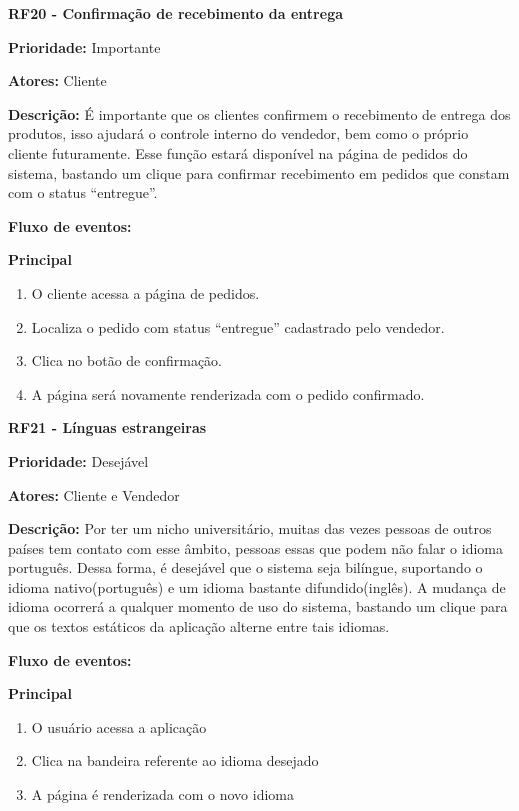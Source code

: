 \begin{apendicesenv}
\textbf{RF20 - Confirmação de recebimento da entrega} \par
\textbf{Prioridade:} Importante \par
\textbf{Atores:} Cliente \par
\textbf{Descrição:} É importante que os clientes confirmem o recebimento de entrega dos produtos, isso ajudará o controle interno do vendedor, bem como o próprio cliente futuramente. Esse função estará disponível na página de pedidos do sistema, bastando um clique para confirmar recebimento em pedidos que constam com o status “entregue”. \par
\textbf{Fluxo de eventos:} \par
\textbf{Principal} \par
\begin{enumerate}
  \item O cliente acessa a página de pedidos.
  \item Localiza o pedido com status “entregue” cadastrado pelo vendedor.
  \item Clica no botão de confirmação.
  \item A página será novamente renderizada com o pedido confirmado.
\end{enumerate}

\textbf{RF21 - Línguas estrangeiras} \par
\textbf{Prioridade:} Desejável \par
\textbf{Atores:} Cliente e Vendedor \par
\textbf{Descrição:} Por ter um nicho universitário, muitas das vezes pessoas de outros países tem contato com esse âmbito, pessoas essas que podem não falar o idioma português. Dessa forma, é desejável que o sistema seja bilíngue, suportando o idioma nativo(português) e um idioma bastante difundido(inglês). A mudança de idioma ocorrerá a qualquer momento de uso do sistema, bastando um clique para que os textos estáticos da aplicação alterne entre tais idiomas. \par
\textbf{Fluxo de eventos:} \par
\textbf{Principal} \par
\begin{enumerate}
  \item O usuário acessa a aplicação
  \item Clica na bandeira referente ao idioma desejado
  \item A página é renderizada com o novo idioma
\end{enumerate}



\end{apendicesenv}
